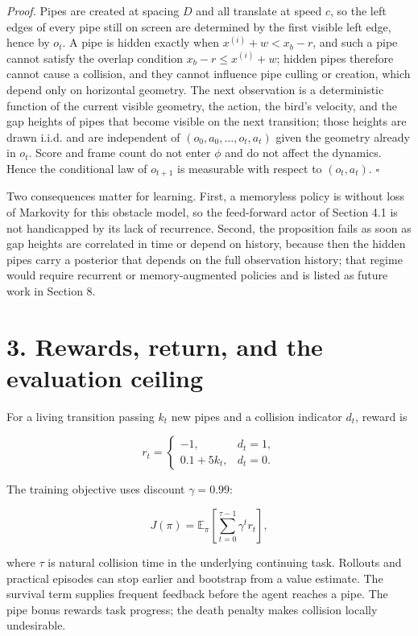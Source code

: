 \documentclass[
  11pt,
]{article}
\begin{document}
\emph{Proof.} Pipes are created at spacing \(D\) and all translate at
speed \(c\), so the left edges of every pipe still on screen are
determined by the first visible left edge, hence by \(o_t\). A pipe is
hidden exactly when \(x^{(i)}+w<x_b-r\), and such a pipe cannot satisfy
the overlap condition \(x_b-r\le x^{(i)}+w\); hidden pipes therefore
cannot cause a collision, and they cannot influence pipe culling or
creation, which depend only on horizontal geometry. The next observation
is a deterministic function of the current visible geometry, the action,
the bird's velocity, and the gap heights of pipes that become visible on
the next transition; those heights are drawn i.i.d. and are independent
of \((o_0,a_0,\ldots,o_t,a_t)\) given the geometry already in \(o_t\).
Score and frame count do not enter \(\phi\) and do not affect the
dynamics. Hence the conditional law of \(o_{t+1}\) is measurable with
respect to \((o_t,a_t)\). \(\square\)

Two consequences matter for learning. First, a memoryless policy is
without loss of Markovity for this obstacle model, so the feed-forward
actor of Section 4.1 is not handicapped by its lack of recurrence.
Second, the proposition fails as soon as gap heights are correlated in
time or depend on history, because then the hidden pipes carry a
posterior that depends on the full observation history; that regime
would require recurrent or memory-augmented policies and is listed as
future work in Section 8.

\section{3. Rewards, return, and the evaluation
ceiling}\label{rewards-return-and-the-evaluation-ceiling}

For a living transition passing \(k_t\) new pipes and a collision
indicator \(d_t\), reward is

\[
r_t=\begin{cases}
-1,&d_t=1,\\
0.1+5k_t,&d_t=0.
\end{cases}
\]

The training objective uses discount \(\gamma=0.99\):

\[
J(\pi)=\mathbb E_{\pi}\left[\sum_{t=0}^{\tau-1}\gamma^tr_t\right],
\]

where \(\tau\) is natural collision time in the underlying continuing
task. Rollouts and practical episodes can stop earlier and bootstrap
from a value estimate. The survival term supplies frequent feedback
before the agent reaches a pipe. The pipe bonus rewards task progress;
the death penalty makes collision locally undesirable.
\end{document}
